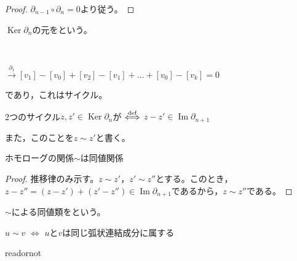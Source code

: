 \documentclass[uplatex]{jsarticle}
\DeclareMathOperator{\Image}{Im}
\DeclareMathOperator{\Kernel}{Ker}
\begin{document}
\begin{proof}
  $\partial_{n-1} \circ \partial_{n} = 0$より従う。
\end{proof}

\begin{teigi}[サイクル]
  $\Kernel \partial_{n}$の元をという。
\end{teigi}

\begin{rei}[サイクルのイメージ]　\\

  $\xrightarrow{\partial_{1}} [v_{1}] - [v_{0}] + [v_{2}] - [v_{1}] + \dots + [v_{0}] - [v_{k}] = 0$
  
  であり，これはサイクル。
\end{rei}

\begin{teigi}[ホモローグ]
  2つのサイクル$z, z' \in \Kernel \partial_{n}$が $\overset{\mathrm{def}}{\Longleftrightarrow}$ $z - z' \in \Image \partial_{n+1}$

  また，このことを$z \sim z'$と書く。
\end{teigi}

\begin{hodai}
  ホモローグの関係$\sim$は同値関係
\end{hodai}

\begin{proof}
  推移律のみ示す。$z \sim z'$，$z' \sim z''$とする。このとき，$z - z'' = (z - z') + (z' - z'') \in \Image \partial_{n+1}$であるから，$z \sim z''$である。
\end{proof}

$\sim$による同値類をという。

\begin{rei}[ホモローグのイメージ]
\end{rei}

\begin{hodai}
  $u \sim v$ $\Longleftrightarrow$ $u$と$v$は同じ弧状連結成分に属する
\end{hodai}

\expandafter\ifx\csname readornot\endcsname\relax
  
\end{document}
